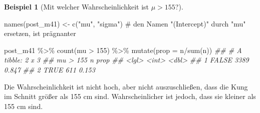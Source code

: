 \documentclass[
  a4paper,
  DIV=11]{scrreprt}
\newenvironment{Shaded}{\begin{snugshade}}{\end{snugshade}}
\newcommand{\AttributeTok}[1]{\textcolor[rgb]{0.40,0.45,0.13}{#1}}
\newcommand{\CommentTok}[1]{\textcolor[rgb]{0.37,0.37,0.37}{#1}}
\newcommand{\DecValTok}[1]{\textcolor[rgb]{0.68,0.00,0.00}{#1}}
\newcommand{\DocumentationTok}[1]{\textcolor[rgb]{0.37,0.37,0.37}{\textit{#1}}}
\newcommand{\FunctionTok}[1]{\textcolor[rgb]{0.28,0.35,0.67}{#1}}
\newcommand{\NormalTok}[1]{\textcolor[rgb]{0.00,0.23,0.31}{#1}}
\newcommand{\OtherTok}[1]{\textcolor[rgb]{0.00,0.23,0.31}{#1}}
\newcommand{\SpecialCharTok}[1]{\textcolor[rgb]{0.37,0.37,0.37}{#1}}
\newcommand{\StringTok}[1]{\textcolor[rgb]{0.13,0.47,0.30}{#1}}
\theoremstyle{definition}
\newtheorem{example}{Beispiel}[chapter]
\theoremstyle{remark}
\begin{document}
\leavevmode{}%
\begin{example}[Mit welcher Wahrscheinlichkeit ist
\(\mu>155\)?]\label{exm-kung1}

\begin{Shaded}
\begin{Highlighting}[]
\FunctionTok{names}\NormalTok{(post\_m41) }\OtherTok{\textless{}{-}} 
  \FunctionTok{c}\NormalTok{(}\StringTok{"mu"}\NormalTok{, }\StringTok{"sigma"}\NormalTok{)  }\CommentTok{\# den Namen "(Intercept)" durch "mu" ersetzen, ist prägnanter}

\NormalTok{post\_m41 }\SpecialCharTok{\%\textgreater{}\%} 
  \FunctionTok{count}\NormalTok{(mu }\SpecialCharTok{\textgreater{}} \DecValTok{155}\NormalTok{) }\SpecialCharTok{\%\textgreater{}\%} 
  \FunctionTok{mutate}\NormalTok{(}\AttributeTok{prop =}\NormalTok{ n}\SpecialCharTok{/}\FunctionTok{sum}\NormalTok{(n))}
\DocumentationTok{\#\# \# A tibble: 2 x 3}
\DocumentationTok{\#\#   \textasciigrave{}mu \textgreater{} 155\textasciigrave{}     n  prop}
\DocumentationTok{\#\#   \textless{}lgl\textgreater{}      \textless{}int\textgreater{} \textless{}dbl\textgreater{}}
\DocumentationTok{\#\# 1 FALSE       3389 0.847}
\DocumentationTok{\#\# 2 TRUE         611 0.153}
\end{Highlighting}
\end{Shaded}

Die Wahrscheinlichkeit ist nicht hoch, aber nicht auszuschließen, dass
die Kung im Schnitt größer als 155 cm sind. Wahrscheinlicher ist jedoch,
dass sie kleiner als 155 cm sind.

\end{example}
\end{document}
